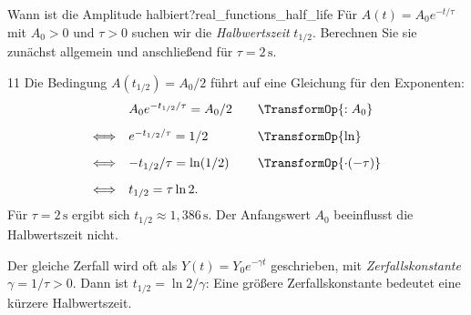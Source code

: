 \begin{ExampleBox}{Wann ist die Amplitude halbiert?}{real_functions_half_life}
  Für $A(t)=A_0e^{-t/\tau}$ mit $A_0>0$ und $\tau>0$ suchen wir die
  \emph{Halbwertszeit}  $t_{1/2}$.
  Berechnen Sie sie zunächst allgemein und anschließend für $\tau=2\,\mathrm{s}$.
  \begin{ClozeArea}[34]{11}
    Die Bedingung $A(t_{1/2})=A_0/2$ führt auf eine Gleichung für den Exponenten:
    \[
      \begin{array}{r@{\quad}l@{\qquad}l}
        &A_0e^{-t_{1/2}/\tau}=A_0/2&\TransformOp{:A_0}\\[0.9em]
        \Longleftrightarrow&e^{-t_{1/2}/\tau}=1/2&\TransformOp{\ln}\\[0.9em]
        \Longleftrightarrow&-t_{1/2}/\tau=\ln(1/2)&\TransformOp{\cdot(-\tau)}\\[0.9em]
        \Longleftrightarrow&t_{1/2}=\tau\ln2.&
      \end{array}
    \]
    Für $\tau=2\,\mathrm{s}$ ergibt sich $t_{1/2}\approx1{,}386\,\mathrm{s}$.
    Der Anfangswert $A_0$ beeinflusst die Halbwertszeit nicht.
  \end{ClozeArea}
\end{ExampleBox}
Der gleiche Zerfall wird oft als $Y(t)=Y_0e^{-\gamma t}$ geschrieben,
mit \emph{Zerfallskonstante}  $\gamma=1/\tau>0$. Dann ist
$t_{1/2}=\ln2/\gamma$: Eine größere Zerfallskonstante bedeutet eine kürzere Halbwertszeit.
\begin{center}
\end{center}
